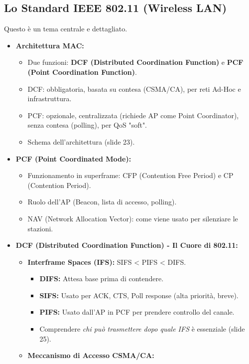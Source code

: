 \subsection{Lo Standard IEEE 802.11 (Wireless LAN)}
Questo è un tema centrale e dettagliato.
\begin{itemize}
    \item \textbf{Architettura MAC:}
    \begin{itemize}
        \item Due funzioni: \textbf{DCF (Distributed Coordination Function)} e \textbf{PCF (Point Coordination Function)}.
        \item DCF: obbligatoria, basata su contesa (CSMA/CA), per reti Ad-Hoc e infrastruttura.
        \item PCF: opzionale, centralizzata (richiede AP come Point Coordinator), senza contesa (polling), per QoS "soft".
        \item Schema dell'architettura (slide 23).
    \end{itemize}
    \item \textbf{PCF (Point Coordinated Mode):}
    \begin{itemize}
        \item Funzionamento in superframe: CFP (Contention Free Period) e CP (Contention Period).
        \item Ruolo dell'AP (Beacon, lista di accesso, polling).
        \item NAV (Network Allocation Vector): come viene usato per silenziare le stazioni.
    \end{itemize}
    \item \textbf{DCF (Distributed Coordination Function) - Il Cuore di 802.11:}
    \begin{itemize}
        \item \textbf{Interframe Spaces (IFS):} SIFS < PIFS < DIFS.
        \begin{itemize}
            \item \textbf{DIFS:} Attesa base prima di contendere.
            \item \textbf{SIFS:} Usato per ACK, CTS, Poll response (alta priorità, breve).
            \item \textbf{PIFS:} Usato dall'AP in PCF per prendere controllo del canale.
            \item Comprendere \textit{chi può trasmettere dopo quale IFS} è essenziale (slide 25).
        \end{itemize}
        \item \textbf{Meccanismo di Accesso CSMA/CA:}

\end{itemize}
\end{itemize}
